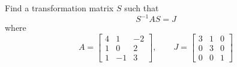 \item Find a transformation matrix $S$ such that
\begin{equation*}
 S^{-1} A S = J
\end{equation*}
where
\begin{equation*}
 A = \begin{bmatrix}
      4 & 1 & -2\\
      1 & 0 & 2\\
      1 & -1 & 3
     \end{bmatrix}
, \qquad
J = \begin{bmatrix}
     3 & 1 & 0\\
     0 & 3 & 0\\
     0 & 0 & 1
    \end{bmatrix}
\end{equation*}

